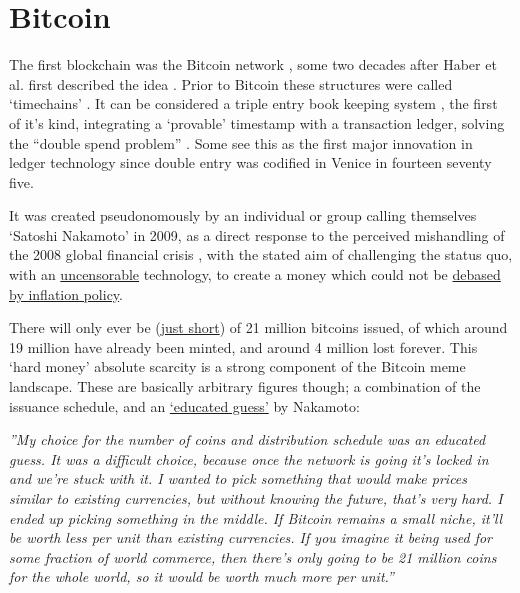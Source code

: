 \section{Bitcoin}
The first blockchain was the Bitcoin network \cite{Nakamoto2008}, some two decades after Haber et al. first described the idea \cite{haber1990time}. Prior to Bitcoin these structures were called `timechains' \cite{nakamoto2018}. It can be considered a triple entry book keeping system \cite{ijiri1986framework, faccia2019accounting}, the first of it's kind, integrating a `provable' timestamp with a transaction ledger, solving the ``double spend problem'' \cite{chohan2021double, perez2019double}. Some see this as the first major innovation in ledger technology since double entry was codified in Venice in fourteen seventy five\cite{sangster2015earliest}. \par
It was created pseudonomously by an individual or group calling themselves `Satoshi Nakamoto' in 2009, as a direct response to the perceived mishandling of the 2008 global financial crisis \cite{nakamoto2018}, with the stated aim of challenging the status quo, with an \href{https://world.hey.com/dhh/i-was-wrong-we-need-crypto-587ccb03}{uncensorable} technology, to create a money which could not be \href{http://p2pfoundation.ning.com/forum/topics/bitcoin-open-source}{debased by inflation policy}. \par
There will only ever be (\href{https://blog.amberdata.io/why-the-bitcoin-supply-will-never-reach-21-million}{just short}) of 21 million bitcoins issued, of which around 19 million have already been minted, and around 4 million lost forever. This `hard money' absolute scarcity is a strong component of the Bitcoin meme landscape. These are basically arbitrary figures though; a combination of the issuance schedule, and an \href{https://plan99.net/~mike/satoshi-emails/thread1.html}{`educated guess'} by Nakamoto: \cite{nakamoto2018}\par 
\textit{''My choice for the number of coins and distribution schedule was an educated guess.  It was a difficult choice, because once the network is going it's locked in and we're stuck with it.  I wanted to pick something that would make prices similar to existing currencies, but without knowing the future, that's very hard.  I ended up picking something in the middle.  If Bitcoin remains a small niche, it'll be worth less per unit than existing currencies.  If you imagine it being used for some fraction of world commerce, then there's only going to be 21 million coins for the whole world, so it would be worth much more per unit.''}\par
